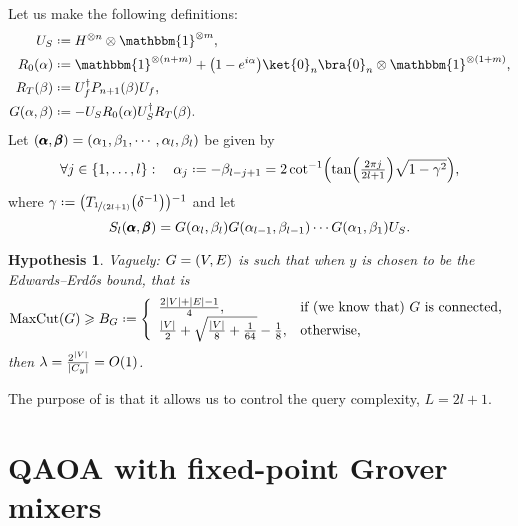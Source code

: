 \documentclass[reqno,oneside,12pt]{amsart}  %
\numberwithin{equation}{section}                %
\let\originalleft\left
\let\originalright\right
\renewcommand{\left}{\mathopen{}\mathclose\bgroup\originalleft}
\renewcommand{\right}{\aftergroup\egroup\originalright}
\def\({\mathopen{}\left(}
\def\){\right)\mathclose{}}
\newcommand*{\eqdef}{\mathrel{\vcenter{\baselineskip0.5ex \lineskiplimit0pt\hbox{.}\hbox{.}}}=}
\newtheorem{hypothesis}[theorem]{Hypothesis}
\def\id{\mathbbm{1}}
\begin{document}
Let us make the following definitions:
\begin{align}
   U_S                     &\eqdef H^{\otimes n} \otimes \id^{\otimes m}, \\
   R_0 \( \alpha \)        &\eqdef \id^{\otimes (n + m)} + \( 1 - e^{i \alpha} \) \ket{0}_n \bra{0}_n \otimes \id^{\otimes (1 + m)}, \\
   R_T \( \beta \)         &\eqdef U_f^\dagger P_{n + 1} \( \beta \) U_f, \\
   G \( \alpha, \beta \)   &\eqdef - U_S R_0 \( \alpha \) U_S^\dagger R_T \( \beta \).
\end{align}
Let $\( \pmb{\alpha}, \pmb{\beta} \) = \( \alpha_1, \beta_1, \cdots, \alpha_l, \beta_l \)$ be given by
\begin{equation}
   \forall j \in \{ 1, \ldots, l \}: \quad \alpha_j \eqdef - \beta_{l - j + 1} = 2 \cot^{- 1} \( \tan \( \tfrac{2 \pi j}{2 l + 1} \) \sqrt{1 - \gamma^2} \),
\end{equation}
where $\gamma \eqdef \( T_{\nicefrac{1}{\( 2 l + 1\)}} \( \delta^{- 1} \) \)^{- 1}$
and let
\begin{equation}
   S_l \( \pmb{\alpha}, \pmb{\beta} \) = G \( \alpha_l, \beta_l \) G \( \alpha_{l - 1}, \beta_{l - 1} \) \cdots G \( \alpha_1, \beta_1 \) U_S. \label{eq:S_l-def}
\end{equation}

\begin{hypothesis}
\label{hypothesis:complexity_bound}
   Vaguely: $G = \( V, E \)$ is such that when $y$ is chosen to be the Edwards--Erd\H{o}s bound, that is
   \begin{equation}
      \mathrm{MaxCut} (G) \geqslant B_G \eqdef \left\{ \begin{array}{ll} \frac{2 |V| + |E| - 1}{4}, & \mbox{if (we know that) $G$ is connected,} \\ \frac{|V|}{2} + \sqrt{\tfrac{|V|}{8} + \tfrac{1}{64}} - \frac{1}{8}, & \mbox{otherwise,} \end{array} \right.
   \end{equation}
   then $\lambda = \tfrac{2^{|V|}}{{\left| C_y \right|}} = O (1)$.
\end{hypothesis}

The purpose of  is that it allows us to control the query complexity, $L = 2 l + 1$.

\bigskip

\section{QAOA with fixed-point Grover mixers}
\end{document}
